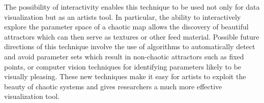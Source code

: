 \documentclass{acmsiggraph}
\begin{document}
The possibility of interactivity enables this technique to be used not only
for data visualization but as an artists tool. In particular, the ability
to interactively explore the parameter space of a chaotic map allows the
discovery of beautiful attractors which can then serve as textures or other
feed material. Possible future directions of this technique involve the use
of algorithms to automatically detect and avoid parameter sets which
result in non-chaotic attractors such as fixed points, or computer vision
techniques for identifying parameters likely to be visually pleasing.
These new techniques make it easy for artists to exploit the beauty of chaotic
systems and gives researchers a much more effective visualization tool.
\end{document}
